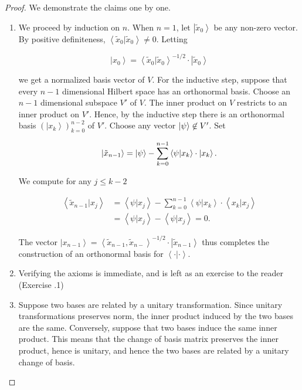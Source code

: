 \documentclass{article}
\theoremstyle{definition}
\numberwithin{figure}{section}
\begin{document}
\begin{proof} We demonstrate the claims one by one.

\begin{enumerate}
\item We proceed by induction on $n$. When $n=1$, let $\left|\tilde{x}_0\right>$ be any non-zero vector. By positive definiteness, $\left<\tilde{x}_0|\tilde{x}_0\right>\neq 0$. Letting

$$\left|x_0\right>=\left<\tilde{x}_0|\tilde{x}_0\right>^{-1/2}\cdot \left|\tilde{x}_0\right>$$

we get a normalized basis vector of $V$. For the inductive step, suppose that every $n-1$ dimensional Hilbert space has an orthonormal basis. Choose an $n-1$ dimensional subspace $V'$ of $V$. The inner product on $V$ restricts to an inner product on $V'$. Hence, by the inductive step there is an orthonormal basis $\left(\left|x_k\right>\right)_{k=0}^{n-2}$ of $V'$. Choose any vector $\left|\psi\right>\not\in V'$. Set

$$\left|\tilde{x}_{n-1}\right>=\left|\psi\right>-\sum_{k=0}^{n-1}\left<\psi|x_k\right>\cdot \left|x_k\right>.$$

We compute for any $j\leq k-2$

\begin{align*}
\left<\tilde{x}_{n-1}| x_j\right>&=\left<\psi | x_j\right>-\sum_{k=0}^{n-1}\left<\psi | x_k\right>\cdot \left< x_{k} | x_j\right>\\
&=\left<\psi | x_j\right>-\left<\psi | x_j\right>=0.
\end{align*}

The vector $\left|x_{n-1}\right>=\left<\tilde{x}_{n-1},\tilde{x}_{n-}\right>^{-1/2}\cdot \left|\tilde{x}_{n-1}\right>$ thus completes the construction of an orthonormal basis for $\left<\cdot | \cdot\right>$.

\item Verifying the axioms is immediate, and is left as an exercise to the reader (Exercise \thesection.1)

\item Suppose two bases are related by a unitary transformation. Since unitary transformations preserves norm, the inner product induced by the two bases are the same. Conversely, suppose that two bases induce the same inner product. This means that the change of basis matrix preserves the inner product, hence is unitary, and hence the two bases are related by a unitary change of basis. 
\end{enumerate}

\end{proof}
\end{document}
